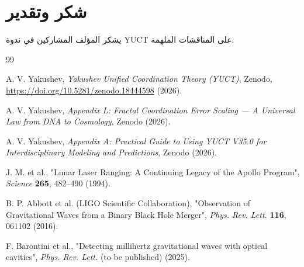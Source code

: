 \documentclass[11pt,a4paper]{article}
\begin{document}
	\section*{شكر وتقدير}
	
	يشكر المؤلف المشاركين في ندوة YUCT على المناقشات الملهمة.
	
	\begin{thebibliography}{99}
		
		A. V. Yakushev, \emph{Yakushev Unified Coordination Theory (YUCT)}, Zenodo, \url{https://doi.org/10.5281/zenodo.18444598} (2026).
		
		A. V. Yakushev, \emph{Appendix L: Fractal Coordination Error Scaling — A Universal Law from DNA to Cosmology}, Zenodo (2026).
		
		A. V. Yakushev, \emph{Appendix A: Practical Guide to Using YUCT V35.0 for Interdisciplinary Modeling and Predictions}, Zenodo (2026).
		
		J. M. et al., "Lunar Laser Ranging: A Continuing Legacy of the Apollo Program", \emph{Science} \textbf{265}, 482–490 (1994).
		
		B. P. Abbott et al. (LIGO Scientific Collaboration), "Observation of Gravitational Waves from a Binary Black Hole Merger", \emph{Phys. Rev. Lett.} \textbf{116}, 061102 (2016).
		
		F. Barontini et al., "Detecting millihertz gravitational waves with optical cavities", \emph{Phys. Rev. Lett.} (to be published) (2025).
		
	\end{thebibliography}
	
\end{document}
